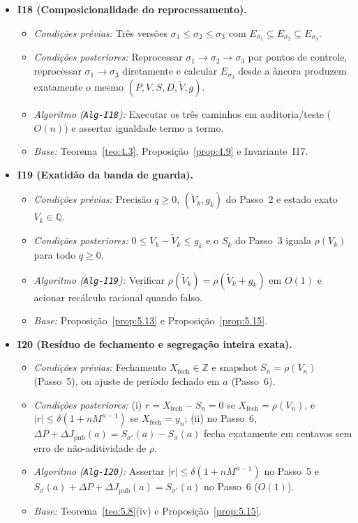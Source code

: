 \documentclass[11pt, a4paper]{article}
\theoremstyle{definition}
\theoremstyle{plain}
\theoremstyle{remark}
\begin{document}
\begin{itemize}
    \item \textbf{I18 (Composicionalidade do reprocessamento).}
    \begin{itemize}
        \item \emph{Condições prévias:} Três versões $\sigma_1 \le \sigma_2 \le \sigma_3$ com $E_{\sigma_1} \subseteq E_{\sigma_2} \subseteq E_{\sigma_3}$.
        \item \emph{Condições posteriores:} Reprocessar $\sigma_1 \to \sigma_2 \to \sigma_3$ por pontos de controle, reprocessar $\sigma_1 \to \sigma_3$ diretamente e calcular $E_{\sigma_3}$ desde a âncora produzem exatamente o mesmo $(P, V, S, D, \tilde{V}, g)$.
        \item \emph{Algoritmo (\texttt{Alg-I18}):} Executar os três caminhos em auditoria/teste ($O(n)$) e assertar igualdade termo a termo.
        \item \emph{Base:} Teorema~\ref{teo:4.3}, Proposição~\ref{prop:4.9} e Invariante~I17.
    \end{itemize}

    \item \textbf{I19 (Exatidão da banda de guarda).}
    \begin{itemize}
        \item \emph{Condições prévias:} Precisão $q \ge 0$, $(\tilde{V}_k, g_k)$ do Passo~2 e estado exato $V_k \in \mathbb{Q}$.
        \item \emph{Condições posteriores:} $0 \le V_k - \tilde{V}_k \le g_k$ e o $S_k$ do Passo~3 iguala $\rho(V_k)$ para todo $q \ge 0$.
        \item \emph{Algoritmo (\texttt{Alg-I19}):} Verificar $\rho(\tilde{V}_k) = \rho(\tilde{V}_k + g_k)$ em $O(1)$ e acionar recálculo racional quando falso.
        \item \emph{Base:} Proposição~\ref{prop:5.13} e Proposição~\ref{prop:5.15}.
    \end{itemize}

    \item \textbf{I20 (Resíduo de fechamento e segregação inteira exata).}
    \begin{itemize}
        \item \emph{Condições prévias:} Fechamento $X_{\text{fech}} \in \mathbb{Z}$ e snapshot $S_n = \rho(V_n)$ (Passo~5), ou ajuste de período fechado em $a$ (Passo~6).
        \item \emph{Condições posteriores:} (i) $r = X_{\text{fech}} - S_n = 0$ se $X_{\text{fech}} = \rho(V_n)$, e $|r| \le \delta(1 + n M^{n-1})$ se $X_{\text{fech}} = y_n$; (ii) no Passo~6, $\Delta P + \Delta J_{\text{pub}}(a) = S_{\sigma'}(a) - S_\sigma(a)$ fecha exatamente em centavos sem erro de não-aditividade de $\rho$.
        \item \emph{Algoritmo (\texttt{Alg-I20}):} Assertar $|r| \le \delta(1 + n M^{n-1})$ no Passo~5 e $S_\sigma(a) + \Delta P + \Delta J_{\text{pub}}(a) = S_{\sigma'}(a)$ no Passo~6 ($O(1)$).
        \item \emph{Base:} Teorema~\ref{teo:5.8}(iv) e Proposição~\ref{prop:5.15}.
    \end{itemize}
\end{itemize}
\end{document}
